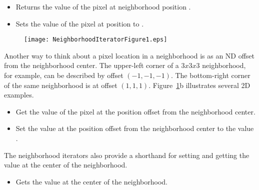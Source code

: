 {\begin{itemize}

\item \textbf{} Returns the value
of the pixel at neighborhood position .

\item \textbf{} Sets
the value of the pixel at position  to .

\end{itemize}

\begin{figure}
\centering
\texttt{[image: NeighborhoodIteratorFigure1.eps]}
\protect\label{fig:NeighborhoodArray}
\end{figure}

Another way to think about a pixel location in a neighborhood is as an ND
offset from the neighborhood center.  The upper-left corner of a $3x3x3$
neighborhood, for example, can be described by offset $(-1, -1, -1)$. The
bottom-right corner of the same neighborhood is at offset $(1, 1, 1)$.  
Figure~\ref{fig:NeighborhoodArray}b illustrates several 2D examples.

\begin{itemize}

\item \textbf{} Get the value of
the pixel at the position offset  from the neighborhood center.

\item \textbf{} Set
the value at the position offset  from the neighborhood center to
the value .

\end{itemize}

The neighborhood iterators also provide a shorthand for setting and getting the
value at the center of the neighborhood.

\begin{itemize}

\item \textbf{} Gets the value at the center
of the neighborhood.


\end{itemize}}
